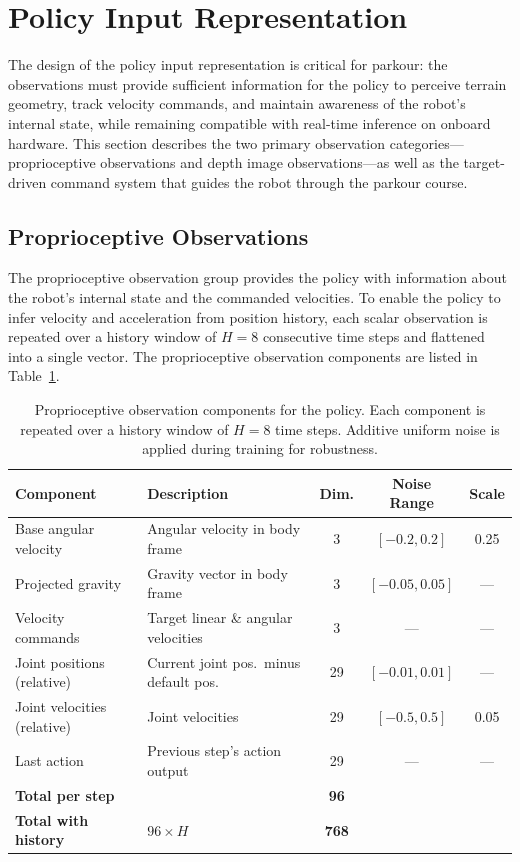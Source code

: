 \section{Policy Input Representation}
\label{sec:policy_input}

The design of the policy input representation is critical for parkour: the observations must provide sufficient information for the policy to perceive terrain geometry, track velocity commands, and maintain awareness of the robot's internal state, while remaining compatible with real-time inference on onboard hardware. This section describes the two primary observation categories---proprioceptive observations and depth image observations---as well as the target-driven command system that guides the robot through the parkour course.

\subsection{Proprioceptive Observations}
\label{sec:proprio_obs}

The proprioceptive observation group provides the policy with information about the robot's internal state and the commanded velocities. To enable the policy to infer velocity and acceleration from position history, each scalar observation is repeated over a history window of $H=8$ consecutive time steps and flattened into a single vector. The proprioceptive observation components are listed in Table~\ref{tab:proprio_obs}.

\begin{table}[t]
\centering
\caption{Proprioceptive observation components for the policy. Each component is repeated over a history window of $H=8$ time steps. Additive uniform noise is applied during training for robustness.}
\label{tab:proprio_obs}
\footnotesize
\begin{tabular}{@{}lp{5.5cm}ccc@{}}
\toprule
\textbf{Component} & \textbf{Description} & \textbf{Dim.} & \textbf{Noise Range} & \textbf{Scale} \\
\midrule
Base angular velocity & Angular velocity in body frame & 3 & $[-0.2, 0.2]$ & 0.25 \\
Projected gravity & Gravity vector in body frame & 3 & $[-0.05, 0.05]$ & --- \\
Velocity commands & Target linear \& angular velocities & 3 & --- & --- \\
Joint positions (relative) & Current joint pos.\ minus default pos. & 29 & $[-0.01, 0.01]$ & --- \\
Joint velocities (relative) & Joint velocities & 29 & $[-0.5, 0.5]$ & 0.05 \\
Last action & Previous step's action output & 29 & --- & --- \\
\midrule
\textbf{Total per step} & & \textbf{96} & & \\
\textbf{Total with history} & $96 \times H$ & \textbf{768} & & \\
\bottomrule
\end{tabular}
\end{table}

